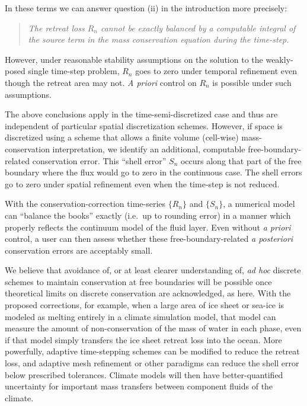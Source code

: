 \documentclass[final,onefignum]{siamart190516}
\begin{document}
In these terms we can answer question (ii) in the introduction more precisely:
\begin{quote}
  \emph{The retreat loss $R_n$ cannot be exactly balanced by a computable integral of the source term in the mass conservation equation during the time-step.}
\end{quote}
However, under reasonable stability assumptions on the solution to the weakly-posed single time-step problem,  $R_n$ goes to zero under temporal refinement even though the retreat area may not.  \emph{A priori} control on $R_n$ is possible under such assumptions.

The above conclusions apply in the time-semi-discretized case and thus are independent of particular spatial discretization schemes.  However, if space is discretized using a scheme that allows a finite volume (cell-wise) mass-conservation interpretation, we identify an additional, computable free-boundary-related conservation error.  This ``shell error'' $S_n$ occurs along that part of the free boundary where the flux would go to zero in the continuous case.  The shell errors go to zero under spatial refinement even when the time-step is not reduced.

With the conservation-correction time-series $\{R_n\}$ and $\{S_n\}$, a numerical model can ``balance the books'' exactly (i.e.~up to rounding error) in a manner which properly reflects the continuum model of the fluid layer.  Even without \emph{a priori} control, a user can then assess whether these free-boundary-related \emph{a posteriori} conservation errors are acceptably small.

We believe that avoidance of, or at least clearer understanding of, \emph{ad hoc} discrete schemes to maintain conservation at free boundaries will be possible once theoretical limits on discrete conservation are acknowledged, as here.  With the proposed corrections, for example, when a large area of ice sheet or sea-ice is modeled as melting entirely in a climate simulation model, that model can measure the amount of non-conservation of the mass of water in each phase, even if that model simply transfers the ice sheet retreat loss into the ocean.  More powerfully, adaptive time-stepping schemes can be modified to reduce the retreat loss, and adaptive mesh refinement or other paradigms can reduce the shell error below prescribed tolerances.  Climate models will then have better-quantified uncertainty for important mass transfers between component fluids of the climate.




\end{document}
